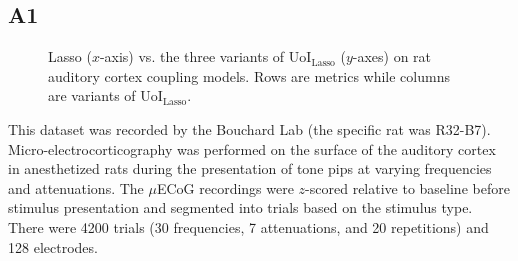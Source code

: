 \documentclass[11pt]{article}
\begin{document}
\subsection{A1}
\begin{figure}
	\vspace{-60pt}
	\centering
	\caption{Lasso ($x$-axis) vs. the three variants of UoI$_{\text{Lasso}}$ ($y$-axes) on rat auditory cortex coupling models. Rows are metrics while columns are variants of UoI$_{\text{Lasso}}$.}
	\label{fig:ecog}
\end{figure}
This dataset was recorded by the Bouchard Lab (the specific rat was R32-B7). Micro-electrocorticography was performed on the surface of the auditory cortex in anesthetized rats during the presentation of tone pips at varying frequencies and attenuations. The $\mu$ECoG recordings were  $z$-scored relative to baseline before stimulus presentation and segmented into trials based on the stimulus type. There were 4200 trials (30 frequencies, 7 attenuations, and 20 repetitions) and 128 electrodes. 
\end{document}
